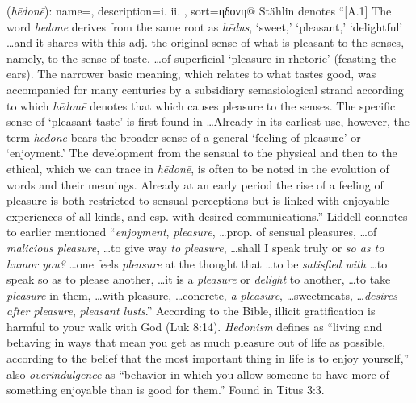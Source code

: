 \item[Overindulgence,]

(\textit{hēdonē}):
{
    name=,
    description={i.  ii. },
    sort=ηδονη@
}
Stählin denotes ``[A.1] The word \emph{hedone} derives from the same root as \emph{hēdus}, `sweet,' `pleasant,' `delightful' \ldots and it shares with this adj. the original sense of what is pleasant to the senses, namely, to the sense of taste. \ldots of superficial `pleasure in rhetoric' (feasting the ears). The narrower basic meaning, which relates to what tastes good, was accompanied for many centuries by a subsidiary semasiological strand according to which \emph{hēdonē} denotes that which causes pleasure to the senses. The specific sense of `pleasant taste' is first found in \ldots Already in its earliest use, however, the term \emph{hēdonē} bears the broader sense of a general `feeling of pleasure' or `enjoyment.' The development from the sensual to the physical and then to the ethical, which we can trace in \emph{hēdonē}, is often to be noted in the evolution of words and their meanings. Already at an early period the rise of a feeling of pleasure is both restricted to sensual perceptions but is linked with enjoyable experiences of all kinds, and esp. with desired communications.''
Liddell connotes to earlier mentioned ``\emph{enjoyment}, \emph{pleasure}, \ldots prop. of sensual pleasures, \ldots of \emph{malicious pleasure}, \ldots to give way \emph{to pleasure}, \ldots shall I speak truly or \emph{so as to humor you?} \ldots one feels \emph{pleasure} at the thought that \ldots to be \emph{satisfied with} \ldots to speak so as to please another, \ldots it is a \emph{pleasure} or \emph{delight} to another, \ldots to take \emph{pleasure} in them, \ldots with pleasure, \ldots concrete, \emph{a pleasure}, \ldots sweetmeats, \ldots \emph{desires after pleasure}, \emph{pleasant lusts}.'' According to the Bible, illicit gratification is harmful to your walk with God (Luk 8:14). \emph{Hedonism} defines as ``living and behaving in ways that mean you get as much pleasure out of life as possible, according to the belief that the most important thing in life is to enjoy yourself,'' also \emph{overindulgence} as ``behavior in which you allow someone to have more of something enjoyable than is good for them.''
Found in Titus 3:3.
